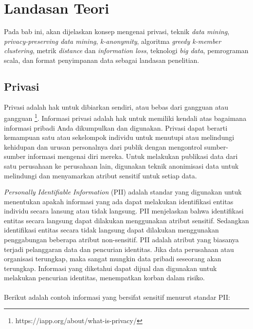 \chapter{Landasan Teori}
\label{chap:teori}
Pada bab ini, akan dijelaskan konsep mengenai privasi, teknik \textit{data mining}, \textit{privacy-preserving data mining}, \textit{k-anonymity}, algoritma \textit{greedy k-member clustering}, metrik \textit{distance} dan \textit{information loss}, teknologi \textit{big data}, pemrograman scala, dan format penyimpanan data sebagai landasan penelitian.

\section{Privasi}
\label{sec:privasi}
Privasi adalah hak untuk dibiarkan sendiri, atau bebas dari gangguan atau gangguan \footnote{https://iapp.org/about/what-is-privacy/}. Informasi privasi adalah hak untuk memiliki kendali atas bagaimana informasi pribadi Anda dikumpulkan dan digunakan. Privasi dapat berarti kemampuan satu atau sekelompok individu untuk menutupi atau melindungi kehidupan dan urusan personalnya dari publik dengan mengontrol sumber-sumber informasi mengenai diri mereka. Untuk melakukan publikasi data dari satu perusahaan ke perusahaan lain, digunakan teknik anonimisasi data untuk melindungi dan menyamarkan atribut sensitif untuk setiap data.

\par \textit{Personally Identifiable Information} (PII) adalah standar yang digunakan untuk menentukan apakah informasi yang ada dapat melakukan identifikasi entitas individu secara lansung atau tidak langsung. PII menjelaskan bahwa identifikasi entitas secara langsung dapat dilakukan menggunakan atribut sensitif. Sedangkan identifikasi entitas secara tidak langsung dapat dilakukan menggunakan penggabungan beberapa atribut non-sensitif. PII adalah atribut  yang biasanya terjadi pelanggaran data dan pencurian identitas. Jika data perusahaan atau organisasi terungkap, maka sangat mungkin data pribadi seseorang akan terungkap. Informasi yang diketahui dapat dijual dan digunakan untuk melakukan pencurian identitas, menempatkan korban dalam risiko.
\\\\
Berikut adalah contoh informasi yang bersifat sensitif menurut standar PII:

